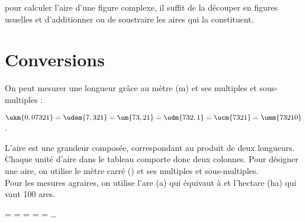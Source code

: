 \begin{remarque}
   pour calculer l'aire d'une figure complexe, il suffit de la \og découper \fg{} en figures usuelles et d'additionner ou de soustraire les aires qui la constituent.
\end{remarque}


\section{Conversions}

On peut mesurer une longueur grâce au mètre (m) et ses multiples et sous-multiples :

\vspace*{-8mm}

\begin{exemple*1}
   $\ukm{0,07321} =\udam{7,321} =\um{73,21}=\udm{732,1} =\ucm{7321} =\umm{73210}$. 
\end{exemple*1}

\bigskip

L'aire est une grandeur composée, correspondant au produit de deux longueurs. Chaque unité d'aire dans le tableau comporte donc deux colonnes. Pour désigner une aire, on utilise le mètre carré (\umq{}) et ses multiples et sous-multiples. \\
Pour les mesures agraires, on utilise l'are (a) qui équivaut à  et l'hectare (ha) qui vaut 100 ares. \smallskip

\vspace*{-8mm}

\begin{exemple*1}
    =  =  =  =  = \dots
\end{exemple*1}


\exercicesbase

